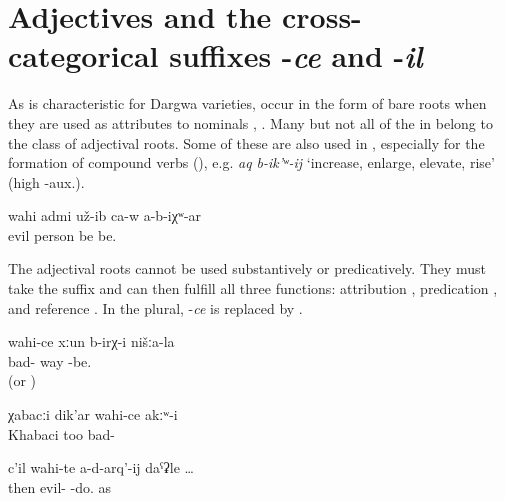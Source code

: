 
\section{Adjectives and the cross-categorical suffixes -\textit{ce} and -\textit{il}}
\label{sec:adjmorphclasses} 

As is characteristic for Dargwa varieties,  occur in the form of bare roots when they are used as attributes to nominals , . Many but not all of the  in  belong to the class of adjectival roots. Some of these  are also used in , especially for the formation of compound verbs (), e.g. \textit{aq b-ik'ʷ-ij} `increase, enlarge, elevate, rise' (high -aux.).

\begin{exe}
	\ex	\label{ex:Probably he was a bad person}
	\gll	wahi	admi	už-ib ca-w	a-b-iχʷ-ar \\
		evil	person	be 	be.\\
	\glt	{}
\end{exe}

The adjectival roots cannot be used substantively or predicatively. They must take the suffix  and can then fulfill all three functions: attribution , predication ,  and reference . In the plural, -\textit{ce} is replaced by  .

\begin{exe}
	\ex	\label{ex:We had a bad road}
	\gll	wahi-ce	xːun	b-irχ-i	nišːa-la\\
		bad-	way	-be.	\\
	\glt	{} (or )

	\ex	\label{ex:Khabaci was also not bad_1}
	\gll	χabacːi	dik'ar	wahi-ce	akːʷ-i \\
		Khabaci	too	bad-	\\
	\glt	{}

	\ex	\label{ex:then like in order not to do bad} {
	\gll	c'il	wahi-te	a-d-arq'-ij	daˁʡle	\ldots\\
		then	evil- 	-do. as\\
	\glt	{}}
\end{exe}

